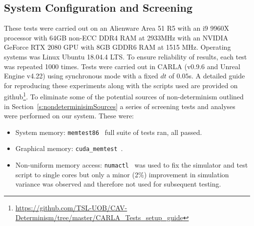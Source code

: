 \documentclass[letterpaper, 10 pt, journal, twoside]{IEEEtran}
\begin{document}
\subsection{System Configuration and Screening}\label{s:screening}
These tests were carried out on an Alienware Area 51 R5 with an i9 9960X processor with 64GB non-ECC DDR4 RAM at 2933MHz with an NVIDIA GeForce RTX 2080 GPU with 8GB GDDR6 RAM at 1515 MHz. 
%
Operating systems was Linux Ubuntu 18.04.4 LTS. To ensure reliability of results, each test was repeated 1000 times. 
%
Tests were carried out in CARLA (v0.9.6 and Unreal Engine v4.22) using synchronous mode with a fixed $dt$ of $0.05$s. 
%
A detailed guide for reproducing these experiments along with the scripts used are provided on github\footnote{\url{https://github.com/TSL-UOB/CAV-Determinism/tree/master/CARLA_Tests_setup_guide}}.
%
To eliminate some of the potential sources of non-determinism outlined in Section~\ref{s:nondeterminisimSources} a series of screening tests and analyses were performed on our system. These were:

\begin{itemize}[leftmargin=*]
    \item System memory: \texttt{memtest86}~\cite{MemTest86} full suite of tests ran, all passed.
    \item Graphical memory: \texttt{cuda\_memtest}~\cite{cuda_memtest}\cite{shi2009testing}.
    \item Non-uniform memory access: \texttt{numactl}~\cite{numactl_NUMA} was used to fix the simulator and test script to single cores but only a minor (2\%) improvement in simulation variance was observed and therefore not used for subsequent testing.
\end{itemize}





\end{document}
